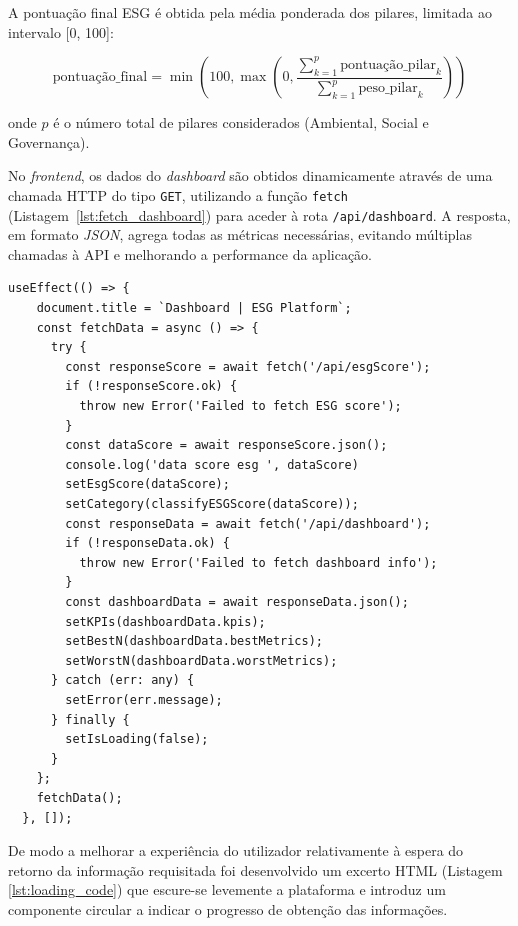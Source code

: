 A pontuação final ESG é obtida pela média ponderada dos pilares, limitada ao intervalo [0, 100]:

\begin{equation}
    \text{pontuação\_final} = \min\left(100, \max\left(0, \frac{\sum_{k=1}^{p} \text{pontuação\_pilar}_k}{\sum_{k=1}^{p} \text{peso\_pilar}_k}\right)\right)
\end{equation}

onde $p$ é o número total de pilares considerados (Ambiental, Social e Governança).

No \textit{frontend}, os dados do \textit{dashboard} são obtidos dinamicamente através de uma chamada HTTP do tipo \texttt{GET}, utilizando a função \texttt{fetch} (Listagem~\ref{lst:fetch_dashboard}) para aceder à rota \texttt{/api/dashboard}. A resposta, em formato \textit{\gls{JSON}}, agrega todas as métricas necessárias, evitando múltiplas chamadas à API e melhorando a performance da aplicação.

\begin{lstlisting}[style=customts, caption={Função responsável por obter os dados do ESG Score e do dashboard no carregamento do componente}, label={lst:fetch_dashboard}]
 useEffect(() => {
    document.title = `Dashboard | ESG Platform`;
    const fetchData = async () => {
      try {
        const responseScore = await fetch('/api/esgScore');
        if (!responseScore.ok) {
          throw new Error('Failed to fetch ESG score');
        }
        const dataScore = await responseScore.json();
        console.log('data score esg ', dataScore)
        setEsgScore(dataScore);
        setCategory(classifyESGScore(dataScore));
        const responseData = await fetch('/api/dashboard');
        if (!responseData.ok) {
          throw new Error('Failed to fetch dashboard info');
        }
        const dashboardData = await responseData.json();
        setKPIs(dashboardData.kpis);
        setBestN(dashboardData.bestMetrics);
        setWorstN(dashboardData.worstMetrics);
      } catch (err: any) {
        setError(err.message);
      } finally {
        setIsLoading(false);
      }
    };
    fetchData();
  }, []);
\end{lstlisting}

De modo a melhorar a experiência do utilizador relativamente à espera do retorno da informação requisitada foi desenvolvido um excerto HTML (Listagem \ref{lst:loading_code}) que escure-se levemente a plataforma e introduz um componente circular a indicar o progresso de obtenção das informações.


